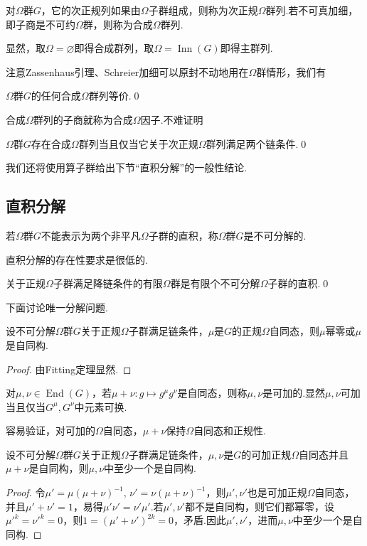 对$\Omega$群$G$，它的次正规列如果由$\Omega$子群组成，则称为{\heiti 次正规$\Omega$群列}.若不可真加细，即子商是不可约$\Omega$群，则称为{\heiti 合成$\Omega$群列}.

显然，取$\Omega=\varnothing$即得合成群列，取$\Omega=\operatorname*{Inn}(G)$即得主群列.

注意Zassenhaus引理、Schreier加细可以原封不动地用在$\Omega$群情形，我们有
\begin{thm}
	$\Omega$群$G$的任何合成$\Omega$群列等价.\qed
\end{thm}

合成$\Omega$群列的子商就称为{\heiti 合成$\Omega$因子}.不难证明
\begin{prop}
	$\Omega$群$G$存在合成$\Omega$群列当且仅当它关于次正规$\Omega$群列满足两个链条件.\qed
\end{prop}

我们还将使用算子群给出下节“直积分解”的一般性结论.

\subsection{直积分解}\label{subsec:DirectDecomposition}
若$\Omega$群$G$不能表示为两个非平凡$\Omega$子群的直积，称$\Omega$群$G$是{\heiti 不可分解的}.

直积分解的存在性要求是很低的.
\begin{thm}
	关于正规$\Omega$子群满足降链条件的有限$\Omega$群是有限个不可分解$\Omega$子群的直积.\qed
\end{thm}

下面讨论唯一分解问题.
\begin{prop}
	设不可分解$\Omega$群$G$关于正规$\Omega$子群满足链条件，$\mu$是$G$的正规$\Omega$自同态，则$\mu$幂零或$\mu$是自同构.
\end{prop}
\begin{proof}
	由Fitting定理显然.
\end{proof}

对$\mu,\nu\in\operatorname*{End}(G)$，若$\mu+\nu\colon g\mapsto g^\mu g^\nu$是自同态，则称$\mu,\nu$是{\heiti 可加的}.显然$\mu,\nu$可加当且仅当$G^\mu,G^\nu$中元素可换.

容易验证，对可加的$\Omega$自同态，$\mu+\nu$保持$\Omega$自同态和正规性.
\begin{prop}
	设不可分解$\Omega$群$G$关于正规$\Omega$子群满足链条件，$\mu,\nu$是$G$的可加正规$\Omega$自同态并且$\mu+\nu$是自同构，则$\mu,\nu$中至少一个是自同构.
\end{prop}
\begin{proof}
	令$\mu'=\mu(\mu+\nu)^{-1},\,\nu'=\nu(\mu+\nu)^{-1}$，则$\mu',\nu'$也是可加正规$\Omega$自同态，并且$\mu'+\nu'=1$，易得$\mu'\nu'=\nu'\mu'$.若$\mu',\nu'$都不是自同构，则它们都幂零，设$\mu'^k=\nu'^k=0$，则$1=(\mu'+\nu')^{2k}=0$，矛盾.因此$\mu',\nu'$，进而$\mu,\nu$中至少一个是自同构.
\end{proof}

